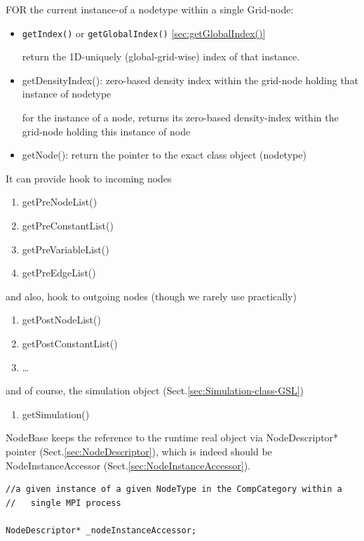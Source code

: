 FOR the current instance-of a nodetype within a single Grid-node:
\begin{itemize}
  \item \verb!getIndex()! or \verb!getGlobalIndex()! \ref{sec:getGlobalIndex()}
  
  return the 1D-uniquely (global-grid-wise) index of that instance.
  

  \item getDensityIndex():  zero-based density index within the grid-node
  holding that instance of nodetype
  
  for the instance of a node, returns its zero-based density-index within
  the grid-node holding this instance of node

  
  \item getNode(): return the pointer to the exact class object (nodetype)
\end{itemize}

It can provide hook to incoming nodes
\begin{enumerate}
  \item getPreNodeList()
  
  \item getPreConstantList()
  
  \item getPreVariableList()
  
  \item getPreEdgeList()
  
\end{enumerate}
and also, hook to outgoing nodes (though we rarely use practically)
\begin{enumerate}
  \item getPostNodeList()
  
  \item getPostConstantList()
  
  \item \ldots
\end{enumerate}

and of course, the simulation object (Sect.\ref{sec:Simulation-class-GSL})
\begin{enumerate}
  \item getSimulation()
\end{enumerate}

NodeBase keeps the reference to the runtime real object via NodeDescriptor*
pointer  (Sect.\ref{sec:NodeDescriptor}), which is indeed should be
NodeInstanceAccessor (Sect.\ref{sec:NodeInstanceAccessor}).

\begin{verbatim}
//a given instance of a given NodeType in the CompCategory within a 
//   single MPI process

NodeDescriptor* _nodeInstanceAccessor;

\end{verbatim}


